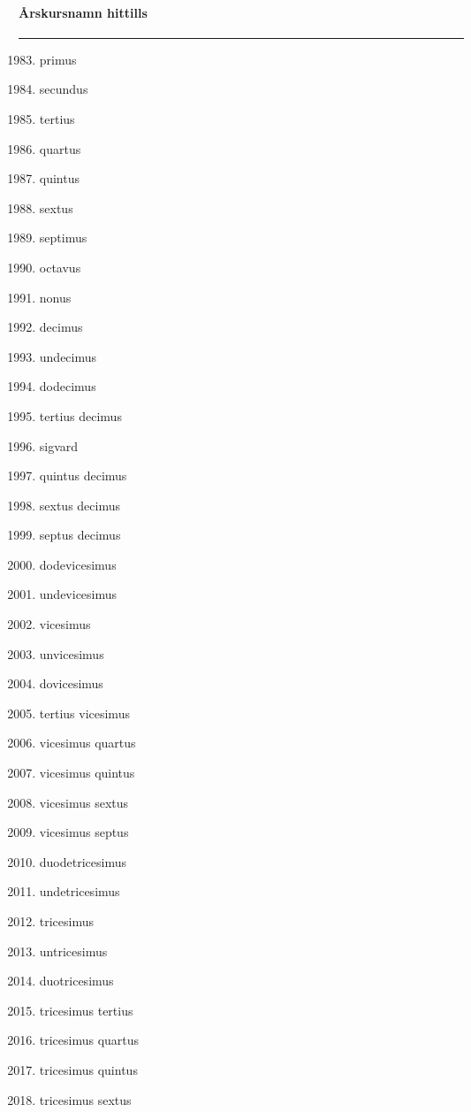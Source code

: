 \begin{song}
\begin{songnotes}
\paragraph{Årskursnamn hittills}
\rule{\textwidth}{0pt}
\begin{multicols}{2}
\begin{enumerate}
\setcounter{enumi}{1982}
\setlength{\itemsep}{0cm}
\setlength{\parskip}{0cm}
\item primus
\item secundus
\item tertius
\item quartus
\item quintus
\item sextus
\item septimus
\item octavus
\item nonus
\item decimus
\item undecimus
\item dodecimus
\item tertius decimus
\item sigvard
\item quintus decimus
\item sextus decimus
\item septus decimus
\item dodevicesimus
\item undevicesimus
\item vicesimus
\item unvicesimus
\item dovicesimus
\item tertius vicesimus
\item vicesimus quartus
\item vicesimus quintus
\item vicesimus sextus
\item vicesimus septus
\item duodetricesimus
\item undetricesimus
\item tricesimus
\item untricesimus
\item duotricesimus
\item tricesimus tertius
\item tricesimus quartus
\item tricesimus quintus
\item tricesimus sextus
\end{enumerate}
\end{multicols}
\end{songnotes}

\end{song}
